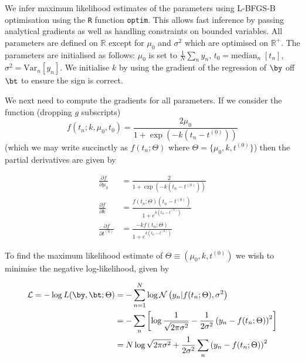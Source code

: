 We infer maximum likelihood estimates of the parameters using L-BFGS-B optimisation \cite{byrd1995limited} using the \texttt{R} function \texttt{optim}. This allows fast inference by passing analytical gradients as well as handling constraints on bounded variables. All parameters are defined on $\mathbb{R}$ except for $\mu_0$ and $\sigma^2$ which are optimised on $\mathbb{R}^+$. The parameters are initialised as follows: $\mu_0$ is set to $\frac{1}{N} \sum_n y_n$, $t_0 = \text{median}_n \;[ t_n]$, $\sigma^2 = \text{Var}_n [y_n]$. We initialise $k$ by using the gradient of the regression of $\by$ off $\bt$ to ensure the sign is correct.

We next need to compute the gradients for all parameters. If we consider the function (dropping $g$ subscripts)
\begin{equation}
	f(t_n; k, \mu_0, t_0) = \frac{2 \mu_0}{1 + \exp\left(-k(t_n - t^{(0)})\right)}
\end{equation}
(which we may write succinctly as $f(t_n; \Theta)$ where $\Theta = \{ \mu_0, k, t^{(0)} \}$) then the partial derivatives are given by

\begin{equation} \label{eq:derivatives}
\begin{aligned}
\frac{\partial f}{\partial \mu_0} & = \frac{2}{1 + \exp\left(-k(t_n - t^{(0)})\right)} \\
\frac{\partial f}{\partial k} & = \frac{ f(t_n; \Theta) (t_n - t^{(0)})}{1 + e^{k(t_n - t^{(0)})}} \\
\frac{\partial f}{\partial t^{(0)}} & = \frac{-k f(t_n; \Theta)}{1 + e^{k(t_n - t^{(0)})}}
\end{aligned}
\end{equation}

To find the maximum likelihood estimate of $\Theta \equiv (\mu_0, k, t^{(0)})$ we wish to minimise the negative log-likelihood, given by

\begin{equation}
\begin{aligned}
\mathcal{L}  = - \log L(\by, \bt; \Theta) & = -\sum_{n=1}^N \log \mathcal{N}\left(y_n | f(t_n; \Theta), \sigma^2 \right) \\
& = -\sum_n \left[ \log \frac{1}{\sqrt{2 \pi \sigma^2}} - \frac{1}{2 \sigma^2} \left( y_n - f(t_n; \Theta) \right)^2\right] \\
& = N \log \sqrt{2 \pi \sigma^2} + \frac{1}{2 \sigma^2} \sum_n \left( y_n - f(t_n; \Theta) \right)^2
\end{aligned}
\end{equation}

